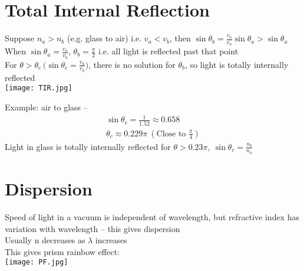 \documentclass[a4paper, 11pt, fleqn, normalem]{report}
\begin{document}
\section{Total Internal Reflection}
Suppose $n_{a} > n_{b}$ (e.g. glass to air) i.e. $v_{a} < v_{b}$, then $\sin{\theta_{b}} = \frac{v_{b}}{v_{a}}\sin{\theta_{a}} > \sin{\theta_{a}}$ \\
When $\sin{\theta_{a}} = \frac{v_{a}}{v_{b}}$, $\theta_{b} = \frac{\pi}{2}$ i.e. all light is reflected past that point \\
For $\theta > \theta_{c} ~\big(\sin{\theta_{c}} = \frac{v_{a}}{v_{b}}\big)$, there is no solution for $\theta_{b}$, so light is totally internally reflected \\
\texttt{[image: TIR.jpg]}

Example: air to glass --
\begin{gather*}
    \sin{\theta_{c}} = \frac{1}{1.52} \approx 0.658 \\
    \theta_{c} \approx 0.229\pi~(\text{Close to }\frac{\pi}{4})
\end{gather*}
Light in glass is totally internally reflected for $\theta > 0.23\pi,~\sin{\theta_{c}} = \frac{n_{b}}{n_{a}}$

\section{Dispersion}
Speed of light in a vacuum is independent of wavelength, but refractive index has variation with wavelength -- this gives dispersion \\
Usually n decreases as $\lambda$ increases \\
This gives prism rainbow effect: \\
\texttt{[image: PF.jpg]}
\end{document}
